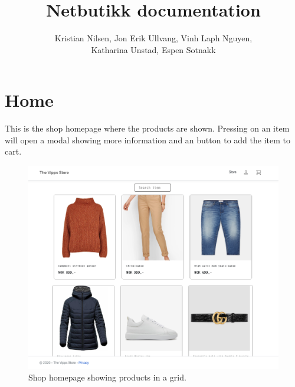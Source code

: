 \documentclass[11pt,a4paper,english]{article}
\title{Netbutikk documentation}
\author{Kristian Nilsen, Jon Erik Ullvang, Vinh Laph Nguyen,\\ Katharina Unstad, Espen Sotnakk}
\begin{document}
\maketitle
{}\selectfont
\section*{Home}
This is the shop homepage where the products are shown. Pressing on an item will open a modal showing more information and an button to add the item to cart.
\begin{figure}[htbp]
  \centering
  \includegraphics[scale=0.3]{home}
  \caption{Shop homepage showing products in a grid.}
  \label{fig:home}
\end{figure}
\end{document}
